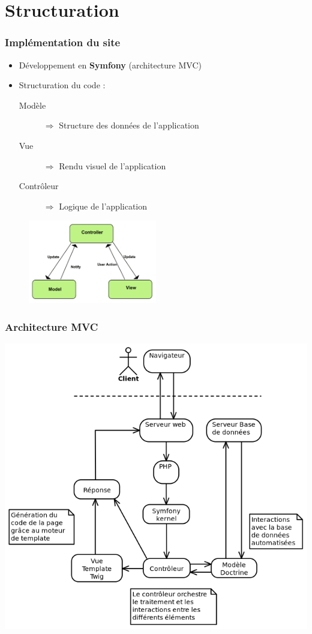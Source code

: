 \section{Structuration}

\begin{frame}
    \frametitle{Implémentation du site}

    \begin{itemize}
        \item Développement en \textbf{Symfony} (architecture MVC)
        \item Structuration du code :
            \begin{description}
                \item[Modèle] $\Rightarrow$ Structure des données de l'application
                \item[Vue] $\Rightarrow$ Rendu visuel de l'application
                \item[Contrôleur] $\Rightarrow$ Logique de l'application
            \end{description}
    \end{itemize}
    \begin{figure}
        \centering
        \includegraphics[width=0.5\textwidth]{pictures/mvc-generic.png}
    \end{figure}
\end{frame}

\begin{frame}
    \frametitle{Architecture MVC}

    \centering
    \includegraphics[width=0.7\linewidth]{pictures/mvc.png}
\end{frame}

